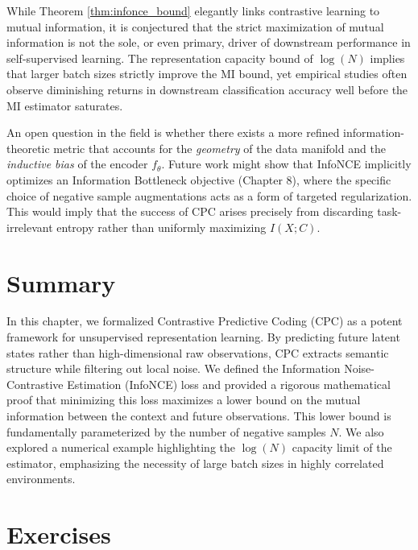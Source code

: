 \begin{horizon}
While Theorem \ref{thm:infonce_bound} elegantly links contrastive learning to mutual information, it is conjectured that the strict maximization of mutual information is not the sole, or even primary, driver of downstream performance in self-supervised learning. The representation capacity bound of $\log(N)$ implies that larger batch sizes strictly improve the MI bound, yet empirical studies often observe diminishing returns in downstream classification accuracy well before the MI estimator saturates. 

An open question in the field is whether there exists a more refined information-theoretic metric that accounts for the \textit{geometry} of the data manifold and the \textit{inductive bias} of the encoder $f_\theta$. Future work might show that InfoNCE implicitly optimizes an Information Bottleneck objective (Chapter 8), where the specific choice of negative sample augmentations acts as a form of targeted regularization. This would imply that the success of CPC arises precisely from discarding task-irrelevant entropy rather than uniformly maximizing $I(X; C)$.
\end{horizon}

\section{Summary}

In this chapter, we formalized Contrastive Predictive Coding (CPC) as a potent framework for unsupervised representation learning. By predicting future latent states rather than high-dimensional raw observations, CPC extracts semantic structure while filtering out local noise. We defined the Information Noise-Contrastive Estimation (InfoNCE) loss and provided a rigorous mathematical proof that minimizing this loss maximizes a lower bound on the mutual information between the context and future observations. This lower bound is fundamentally parameterized by the number of negative samples $N$. We also explored a numerical example highlighting the $\log(N)$ capacity limit of the estimator, emphasizing the necessity of large batch sizes in highly correlated environments.

\section{Exercises}

